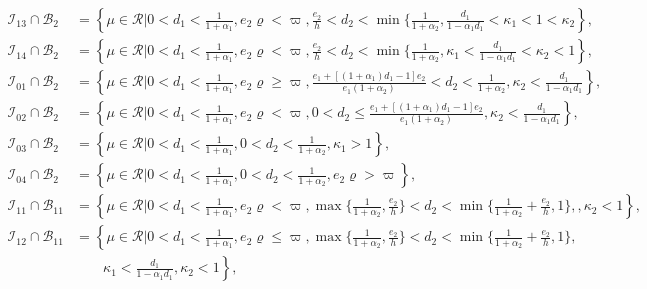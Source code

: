 \documentclass{ws-ijbc}
\begin{document}
\begin{equation*}
\begin{aligned}
\mathcal{I}_{13}\cap\mathcal{B}_{2}&=\left\{\mu\in \mathcal{R}
\big|0<d_{1}<\frac{1}{1+\alpha_{1}},e_{2}\varrho<\varpi,\frac{e_{2}}{h}<d_{2}<\min\{\frac{1}{1+\alpha_{2}},\frac{d_{1}}{1-\alpha_{1}d_{1}}<\kappa_{1}<1<\kappa_{2} \right\},\\
\mathcal{I}_{14}\cap\mathcal{B}_{2}&=\left\{\mu\in \mathcal{R}
\big|0<d_{1}<\frac{1}{1+\alpha_{1}},e_{2}\varrho<\varpi,\frac{e_{2}}{h}<d_{2}<\min\{\frac{1}{1+\alpha_{2}},\kappa_{1}<\frac{d_{1}}{1-\alpha_{1}d_{1}}<\kappa_{2}<1 \right\},\\
\mathcal{I}_{01}\cap\mathcal{B}_{2}&=\left\{\mu\in \mathcal{R}
\big|0<d_{1}<\frac{1}{1+\alpha_{1}},e_{2}\varrho\geq\varpi,\frac{e_{1}+[(1+\alpha_{1})d_{1}-1]e_{2}}{e_{1}(1+\alpha_{2})}<d_{2}<\frac{1}{1+\alpha_{2}},  \kappa_{2}<\frac{d_{1}}{1-\alpha_{1}d_{1}}\right\},\\
\mathcal{I}_{02}\cap\mathcal{B}_{2}&=\left\{\mu\in \mathcal{R}
\big|0<d_{1}<\frac{1}{1+\alpha_{1}},e_{2}\varrho<\varpi, 0<d_{2}\leq\frac{e_{1}+[(1+\alpha_{1})d_{1}-1]e_{2}}{e_{1}(1+\alpha_{2})}, \kappa_{2}<\frac{d_{1}}{1-\alpha_{1}d_{1}} \right\},\\
\mathcal{I}_{03}\cap\mathcal{B}_{2}&=\left\{\mu\in \mathcal{R}\big|0<d_{1}<\frac{1}{1+\alpha_{1}},0<d_{2}<\frac{1}{1+\alpha_{2}},\kappa_{1}>1\right\},\\
\mathcal{I}_{04}\cap\mathcal{B}_{2}&=\left\{\mu\in \mathcal{R}\big|0<d_{1}<\frac{1}{1+\alpha_{1}},0<d_{2}<\frac{1}{1+\alpha_{2}},e_{2}\varrho>\varpi\right\},\\
\mathcal{I}_{11}\cap\mathcal{B}_{11}&=\left\{\mu\in \mathcal{R}
\big|0<d_{1}<\frac{1}{1+\alpha_{1}},e_{2}\varrho<\varpi, \max\{\frac{1}{1+\alpha_{2}},\frac{e_{2}}{h}\}<d_{2}<\min\{\frac{1}{1+\alpha_{2}}+\frac{e_{2}}{h},1\},
,\kappa_{2}<1\right\},\\
\mathcal{I}_{12}\cap\mathcal{B}_{11}&=\left\{\mu\in \mathcal{R}
\big|0<d_{1}<\frac{1}{1+\alpha_{1}},e_{2}\varrho\leq\varpi, \max\{\frac{1}{1+\alpha_{2}},\frac{e_{2}}{h}\}<d_{2}<\min\{\frac{1}{1+\alpha_{2}}+\frac{e_{2}}{h},1\},\right.\\
&\qquad\left.\kappa_{1}<\frac{d_{1}}{1-\alpha_{1}d_{1}}, \kappa_{2}<1\right\},\\
\end{aligned}
\end{equation*}
\end{document}
